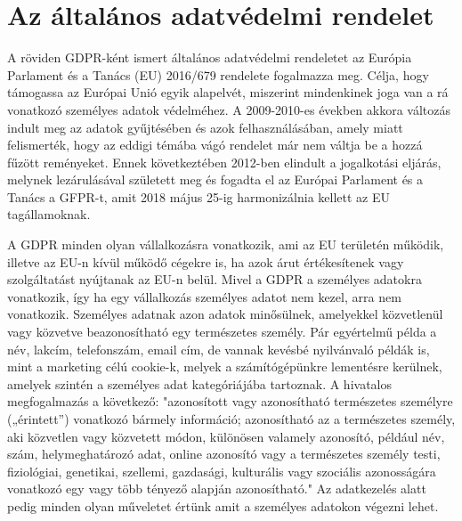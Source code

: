 \section{Az általános adatvédelmi rendelet}

A röviden GDPR-ként ismert általános adatvédelmi rendeletet az Európia Parlament és a Tanács (EU) 2016/679 rendelete fogalmazza meg. Célja, hogy támogassa az Európai Unió egyik alapelvét, miszerint mindenkinek joga van a rá vonatkozó személyes adatok védelméhez. A 2009-2010-es években akkora változás indult meg az adatok gyűjtésében és azok felhasználásában, amely miatt felismerték, hogy az eddigi témába vágó rendelet már nem váltja be a hozzá fűzött reményeket. Ennek következtében 2012-ben elindult a jogalkotási eljárás, melynek lezárulásával született meg és fogadta el az Európai Parlament és a Tanács a GFPR-t, amit 2018 május 25-ig harmonizálnia kellett az EU tagállamoknak.

A GDPR minden olyan vállalkozásra vonatkozik, ami az EU területén működik, illetve az EU-n kívül működő cégekre is, ha azok árut értékesítenek vagy szolgáltatást nyújtanak az EU-n belül. Mivel a GDPR a személyes adatokra vonatkozik, így ha egy vállalkozás személyes adatot nem kezel, arra nem vonatkozik. Személyes adatnak azon adatok minősülnek, amelyekkel közvetlenül vagy közvetve beazonosítható egy természetes személy. Pár egyértelmű példa a név, lakcím, telefonszám, email cím, de vannak kevésbé nyilvánvaló példák is, mint a marketing célú cookie-k, melyek a számítógépünkre lementésre kerülnek, amelyek szintén a személyes adat kategóriájába tartoznak. A hivatalos megfogalmazás a következő: "azonosított vagy azonosítható természetes személyre („érintett”) vonatkozó bármely információ; azonosítható az a természetes személy, aki közvetlen vagy közvetett módon, különösen valamely azonosító, például név, szám, helymeghatározó adat, online azonosító vagy a természetes személy testi, fiziológiai, genetikai, szellemi, gazdasági, kulturális vagy szociális azonosságára vonatkozó egy vagy több tényező alapján azonosítható." \cite{GDPR} Az adatkezelés alatt pedig minden olyan műveletet értünk amit a személyes adatokon végezni lehet.

